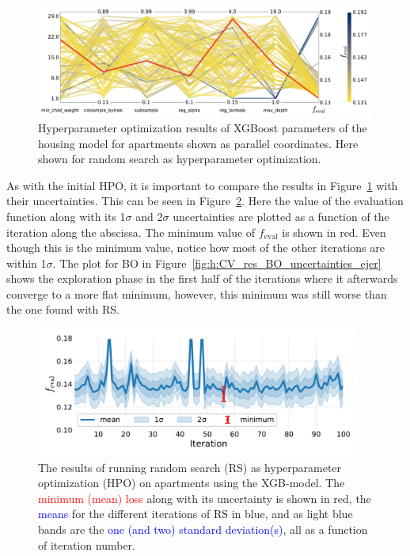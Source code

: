 \begin{figure}
  \centerfloat
  \includegraphics[width=0.99\textwidth, trim=0 0 0 0, clip]{figures/housing/Ejerlejlighed_v19_cut_all_Ncols_all_CV_viz_HPO_RS.pdf}
  \caption[Parallel Coordinate Plot of the Random Search Hyperparameter Optimization Results of XGBoost for Apartments]
          {Hyperparameter optimization results of XGBoost parameters of the housing model for apartments shown as parallel coordinates. Here shown for random search as hyperparameter optimization. } 
  \label{fig:h:CV_res_RS_parallel_coords_ejer_non_appendix}
\end{figure}

As with the initial HPO, it is important to compare the results in Figure~\ref{fig:h:CV_res_RS_parallel_coords_ejer_non_appendix} with their uncertainties. This can be seen in Figure~\ref{fig:h:CV_res_RS_uncertainties_ejer}. Here the value of the evaluation function along with its \num{1}$\sigma$  and \num{2}$\sigma$ uncertainties are plotted as a function of the iteration along the abscissa. The minimum value of $f_\mathrm{eval}$ is shown in red. Even though this is the minimum value, notice how most of the other iterations are within \num{1}$\sigma$. The plot for BO in Figure~\ref{fig:h:CV_res_BO_uncertainties_ejer} shows the exploration phase in the first half of the iterations where it afterwards converge to a more flat minimum, however, this minimum was still worse than the one found with RS. 

\begin{figure}
  \centerfloat
  \includegraphics[width=0.95\textwidth, trim=10 20 10 10, clip]{figures/housing/Ejerlejlighed_v19_cut_all_Ncols_all_xgb_score_over_time_random.pdf}
  \caption[Hyperparameter Optimization: Random Search Results]
          {The results of running random search (RS) as hyperparameter optimization (HPO) on apartments using the XGB-model. The \textcolor{red}{minimum (mean) loss} along with its uncertainty is shown in red, the \textcolor{blue}{means} for the different iterations of RS in blue, and as light blue bands are the \textcolor{blue}{one (and two) standard deviation(s)}, all as a function of iteration number.} 
  \label{fig:h:CV_res_RS_uncertainties_ejer}
\end{figure}

